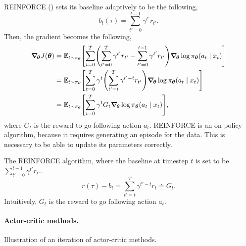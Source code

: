 REINFORCE () sets its baseline adaptively to be the
following, \[
  b_t(\tau) = \sum_{t'=0}^{t-1} \gamma^{t'} r_{t'}.
\]
Then, the gradient becomes the following, 
\begin{align*}
  \grad{J(\vec{\theta})}{\vec{\theta}} &= \E_{t\sim\pi_{\vec{\theta}}} \lft[ \sum_{t=0}^T \lft( \sum_{t'=0}^{T} \gamma^{t'} r_{t'} - \sum_{t'=0}^{t-1} \gamma^{t'} r_{t'} \rgt) \grad{\log \pi_{\vec{\theta}}(a_t\mid x_t)}{\vec{\theta}} \rgt] \\
  &= \E_{t\sim\pi_{\vec{\theta}}} \lft[ \sum_{t=0}^T \gamma^t \lft( \sum_{t'=t}^{T} \gamma^{t'-t} r_{t'} \rgt) \grad{\log \pi_{\vec{\theta}}(a_t\mid x_t)}{\vec{\theta}} \rgt] \\
  &= \E_{t\sim\pi_{\vec{\theta}}} \lft[ \sum_{t=0}^T \gamma^t G_t \grad{\log \pi_{\vec{\theta}}(a_t\mid x_t)}{\vec{\theta}} \rgt],
\end{align*}
where $G_t$ is the reward to go following action $a_t$. REINFORCE is an
on-policy algorithm, because it requires generating an episode for the data.
This is necessary to be able to update its parameters correctly.

\begin{algorithm}[t]
  \begin{algorithmic}[1]
      \Repeat
        \EndFor
    \EndFunction
  \end{algorithmic}
  \caption{The REINFORCE algorithm, where the baseline at timestep $t$ is set to
  be $\sum_{t'=0}^{t-1} \gamma^{t'}r_{t'}$. \[ r(\tau) - b_t =
  \sum_{t'=t}^T \gamma^{t'-t} r_t \doteq G_t .\] Intuitively, $G_t$ is the reward to go
  following action $a_t$.}
  \label{alg:reinforce}
\end{algorithm}

\paragraph{Actor-critic methods.}

\begin{marginfigure}
    \centering
    \caption{Illustration of an iteration of actor-critic methods.}
    \label{fig:actor-critic}
\end{marginfigure}

